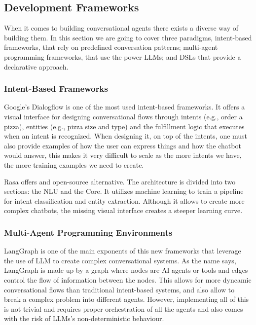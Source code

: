 \subsection{Development Frameworks}

When it comes to building conversational agents
there exists a diverse way of building them.
In this section we are going to cover three paradigms,
intent-based frameworks, that rely on predefined conversation patterns;
multi-agent programming frameworks, that use the power \acp{LLM};
and \aclp{DSL} that provide a declarative approach.

\subsubsection{Intent-Based Frameworks}

Google's Dialogflow \autocite{Dialogflow}
is one of the most used intent-based frameworks.
It offers a visual interface
for designing conversational flows
through intents (e.g., order a pizza),
entities (e.g., pizza size and type)
and the fulfillment logic that executes when an intent is recognized.
When designing it, on top of the intents,
one must also provide examples of how the user can express things
and how the chatbot would answer,
this makes it very difficult to scale
as the more intents we have,
the more training examples we need to create.

Rasa \autocite{Rasa2020} offers and open-source \autocite{RasaHQRasa2025} alternative.
The architecture is divided into two sections:
the \ac{NLU} and the Core.
It utilizes machine learning to train a pipeline
for intent classification and entity extraction.
Although it allows to create more complex chatbots,
the missing visual interface creates a steeper learning curve.

\subsubsection{Multi-Agent Programming Environments}

LangGraph \autocite{LangGraph} is one of the main exponents
of this new frameworks that leverage the use of \ac{LLM}
to create complex conversational systems.
As the name says, LangGraph is made up by a graph
where nodes are \ac{AI} agents or tools
and edges control the flow of information between the nodes.
This allows for more dyncamic conversational flows
than traditional intent-based systems,
and also allow to break a complex problem into different agents.
However, implementing all of this is not trivial
and requires proper orchestration of all the agents
and also comes with the risk of \acp{LLM}'s non-deterministic behaviour.

